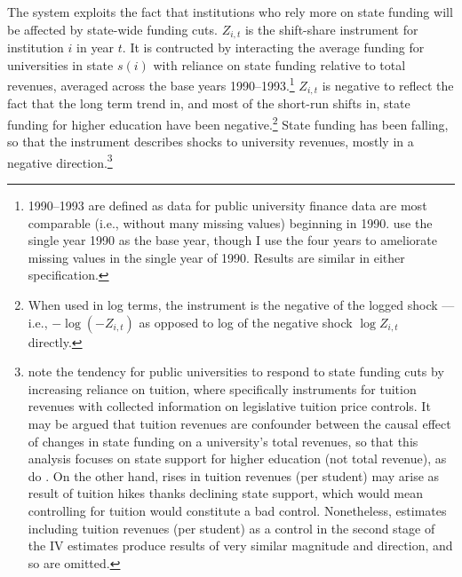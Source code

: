 The system exploits the fact that institutions who rely more on state funding will be affected by state-wide funding cuts.
$Z_{i,t}$ is the shift-share instrument for institution $i$ in year $t$.
It is contructed by interacting the average funding for universities in state $s(i)$ with reliance on state funding relative to total revenues, averaged across the base years 1990--1993.\footnote{
    1990--1993 are defined as data for public university finance data are most comparable (i.e., without many missing values) beginning in 1990.
    \cite{NBERw23736} use the single year 1990 as the base year, though I use the four years to ameliorate missing values in the single year of 1990.
    Results are similar in either specification.
}
$Z_{i,t}$ is negative to reflect the fact that the long term trend in, and most of the short-run shifts in, state funding for higher education have been negative.\footnote{
    When used in log terms, the instrument is the negative of the logged shock --- i.e., $- \log \left( -Z_{i,t} \right)$ as opposed to log of the negative shock $\log Z_{i,t}$ directly.
}
State funding has been falling, so that the instrument describes shocks to university revenues, mostly in a negative direction.\footnote{
    \label{foot:control}
    \cite{NBERw27885} note the tendency for public universities to respond to state funding cuts by increasing reliance on tuition, where \cite{NBERw23736} specifically instruments for tuition revenues with collected information on legislative tuition price controls.
    It may be argued that tuition revenues are confounder between the causal effect of changes in state funding on a university's total revenues, so that this analysis focuses on state support for higher education (not total revenue), as do \cite{NBERw27885}.
    On the other hand, rises in tuition revenues (per student) may arise as result of tuition hikes thanks declining state support, which would mean controlling for tuition would constitute a bad control.
    Nonetheless, estimates including tuition revenues (per student) as a control in the second stage of the IV estimates produce results of very similar magnitude and direction, and so are omitted.
}

